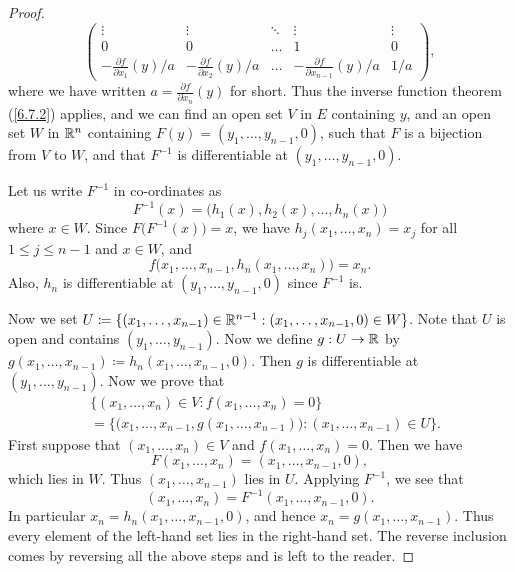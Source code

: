 \begin{proof}
\[\begin{pmatrix}
      \vdots                                  & \vdots                                  & \ddots & \vdots                                        & \vdots \\
      0                                       & 0                                       & \dots  & 1                                             & 0      \\
      -\frac{\partial f}{\partial x_1}(y) / a & -\frac{\partial f}{\partial x_2}(y) / a & \dots  & -\frac{\partial f}{\partial x_{n - 1}}(y) / a & 1 / a
    \end{pmatrix},
  \]
  where we have written \(a = \frac{\partial f}{\partial x_n}(y)\) for short.
  Thus the inverse function theorem (\cref{6.7.2}) applies, and we can find an open set \(V\) in \(E\) containing \(y\), and an open set \(W\) in \(\mathbb{R}^n\) containing \(F(y) = (y_1, \dots, y_{n - 1}, 0)\), such that \(F\) is a bijection from \(V\) to \(W\), and that \(F^{-1}\) is differentiable at \((y_1, \dots, y_{n - 1}, 0)\).

  Let us write \(F^{-1}\) in co-ordinates as
  \[
    F^{-1}(x) = \big(h_1(x), h_2(x), \dots, h_n(x)\big)
  \]
  where \(x \in W\).
  Since \(F\big(F^{-1}(x)\big) = x\), we have \(h_j(x_1, \dots, x_n) = x_j\) for all \(1 \leq j \leq n - 1\) and \(x \in W\), and
  \[
    f\big(x_1, \dots, x_{n - 1}, h_n(x_1, \dots, x_n)\big) = x_n.
  \]
  Also, \(h_n\) is differentiable at \((y_1, \dots, y_{n - 1}, 0)\) since \(F^{-1}\) is.

  Now we set \(U \coloneqq \{(x_1, \dots, x_{n - 1}) \in \mathbb{R}^{n - 1} : (x_1, \dots, x_{n - 1}, 0) \in W\}\).
  Note that \(U\) is open and contains \((y_1, \dots, y_{n - 1})\).
  Now we define \(g : U \to \mathbb{R}\) by \(g(x_1, \dots, x_{n - 1}) \coloneqq h_n(x_1, \dots, x_{n - 1}, 0)\).
  Then \(g\) is differentiable at \((y_1, \dots, y_{n - 1})\).
  Now we prove that
  \begin{align*}
     & \{(x_1, \dots, x_n) \in V : f(x_1, \dots, x_n) = 0\}                                                     \\
     & = \Big\{\big(x_1, \dots, x_{n - 1}, g(x_1, \dots, x_{n - 1})\big) : (x_1, \dots, x_{n - 1}) \in U\Big\}.
  \end{align*}
  First suppose that \((x_1, \dots, x_n) \in V\) and \(f(x_1, \dots, x_n) = 0\).
  Then we have
  \[
    F(x_1, \dots, x_n) = (x_1, \dots, x_{n - 1}, 0),
  \]
  which lies in \(W\).
  Thus \((x_1, \dots, x_{n - 1})\) lies in \(U\).
  Applying \(F^{-1}\), we see that
  \[
    (x_1, \dots, x_n) = F^{-1}(x_1, \dots, x_{n - 1}, 0).
  \]
  In particular \(x_n = h_n(x_1, \dots, x_{n - 1}, 0)\), and hence \(x_n = g(x_1, \dots, x_{n - 1})\).
  Thus every element of the left-hand set lies in the right-hand set.
  The reverse inclusion comes by reversing all the above steps and is left to the reader.


\end{proof}
